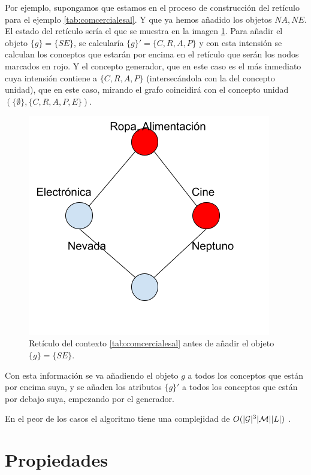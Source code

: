 \documentclass[oneside,openright,titlepage,numbers=noenddot,openany,headinclude,footinclude=true,
cleardoublepage=empty,abstractoff,BCOR=5mm,paper=a4,fontsize=12pt,main=spanish]{scrreprt}
\begin{document}
Por ejemplo, supongamos que estamos en el proceso de construcción del retículo para el ejemplo \ref{tab:comcercialesal}. Y que ya hemos añadido los objetos $NA,NE$. El estado del retículo sería el que se muestra en la imagen \ref{fig:norris}. Para añadir el objeto $\{g\}=\{SE\}$, se calcularía $\{g\}'=\{C,R,A,P\}$ y con esta intensión se calculan los conceptos que estarán por encima en el retículo que serán los nodos marcados en rojo. Y el concepto generador, que en este caso es el más inmediato cuya intensión contiene a $\{C,R,A,P\}$ (intersecándola con la del concepto unidad), que en este caso, mirando el grafo coincidirá con el concepto unidad $(\{\emptyset\},\{C,R,A,P,E\})$. 

\begin{figure}[H]
  \centering
  \includegraphics[scale=0.5]{images/addintent(1).png}
\caption{Retículo del contexto \ref{tab:comcercialesal} antes de añadir el objeto $\{g\}=\{SE\}$.}
  \label{fig:norris}

\end{figure}
Con esta información se va añadiendo el objeto $g$ a todos los conceptos que están por encima suya, y se añaden los atributos $\{g\}'$ a todos los conceptos que están por debajo suya, empezando por el generador.

En el peor de los casos el algoritmo tiene una complejidad de $O(|\mathcal{G}|^3 |\mathcal{M}| |L|)$ \cite{norris_algorithm_1978}.

\section{Propiedades}
\end{document}
